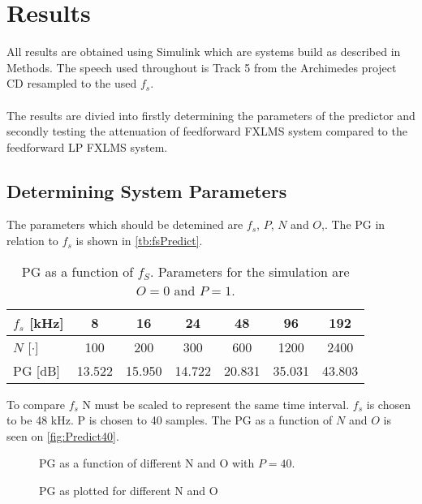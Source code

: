 \section{Results}
All results are obtained using Simulink\textsuperscript{\textregistered} which are systems build as described in Methods. The speech used throughout is Track 5 from the Archimedes project CD resampled to the used $f_s$.  
\\\\
The results are divied into firstly determining the parameters of the predictor and secondly testing the attenuation of feedforward FXLMS system compared to the feedforward LP FXLMS system.   

\subsection{Determining System Parameters}
The parameters which should be detemined are $f_s$, $P$, $N$ and $O$,.         
The PG in relation to $f_s$ is shown in \autoref{tb:fsPredict}.

\begin{table}[H]
\centering
\begin{tabular}{|l|c|c|c|c|c|c|}
\hline
$f_s$ {[}kHz{]} & 8 & 16 & 24 & 48 & 96 & 192 \\ \hline 
$N$ {[}$\cdot${]} & 100 & 200 & 300 & 600 & 1200 & 2400 \\ \hline 
PG {[}dB{]} & 13.522 & 15.950 & 14.722 & 20.831 & 35.031 & 43.803 \\ \hline
\end{tabular}
\caption{PG as a function of $f_S$. Parameters for the simulation are $O=0$ and $P=1$.}
\label{tb:fsPredict}
\end{table}

To compare $f_s$ N must be scaled to represent the same time interval. $f_s$ is chosen to be 48 kHz. P is chosen to 40 samples.  
The PG as a function of $N$ and $O$ is seen on \autoref{fig:Predict40}. 

\begin{figure}[H]
	\centering
	
	\caption{PG as a function of different N and O with $P=40$.}
	\label{fig:Predict40}
\end{figure}

\begin{figure}[H]
	\centering
	
	\caption{PG as plotted for different N and O}
	\label{fig:Predict10}
\end{figure}

